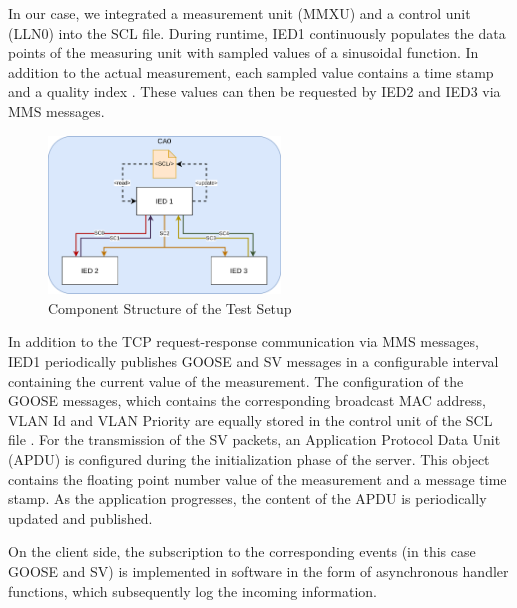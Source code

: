 \documentclass[conference, onecolumn, a4paper]{IEEEtran}
\begin{document}
\smallskip
In our case, we integrated a measurement unit (MMXU) \cite[p. 268]{IEC61850-7-4:2010} and a control unit (LLN0) \cite[p. 164]{IEC61850-7-4:2010} 
into the SCL file. During runtime, IED1 continuously populates the data points of the measuring unit with sampled values of a sinusoidal function. In 
addition to the actual measurement, each sampled value contains a time stamp and a quality index \cite[p. 61ff]{IEC61850-7-3:2010}. These values can 
then be requested by IED2 and IED3 via MMS messages.

\begin{figure}[h]
    \centering
    \includegraphics[width=0.55\textwidth]{images/TestSetupIEDs.png}
    \caption{Component Structure of the Test Setup}
    \label{image:MACsecTestSetup}
\end{figure}

\noindent In addition to the TCP request-response communication via MMS messages, IED1 periodically publishes GOOSE and SV messages in a configurable 
interval containing the current value of the measurement. The configuration of the GOOSE messages, which contains the corresponding broadcast MAC address, 
VLAN Id and VLAN Priority are equally stored in the control unit of the SCL file \cite[p. 189]{IEC61850-8-1:2011}. For the transmission of the SV 
packets, an Application Protocol Data Unit (APDU) is configured during the initialization phase of the server. This object contains the floating point 
number value of the measurement and a message time stamp. As the application progresses, the content of the APDU is periodically updated and published. 

\smallskip 
On the client side, the subscription to the corresponding events (in this case GOOSE and SV) is implemented in software in the form of asynchronous 
handler functions, which subsequently log the incoming information. 

\end{document}
